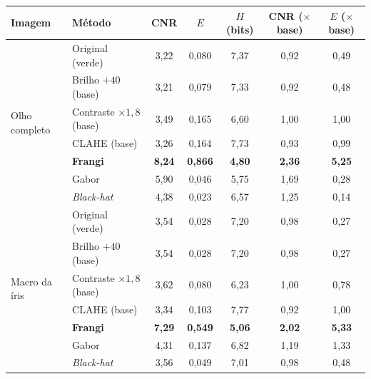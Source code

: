 \begin{tabular}{llccccc}
\toprule
Imagem & Método & CNR & $E$ & $H$ (bits) & CNR ($\times$base) & $E$ ($\times$base) \\
\midrule
\multirow{7}{*}{Olho completo} & Original (verde) & 3,22 & 0,080 & 7,37 & 0,92 & 0,49 \\
 & Brilho $+40$ (base) & 3,21 & 0,079 & 7,33 & 0,92 & 0,48 \\
 & Contraste $\times1{,}8$ (base) & 3,49 & 0,165 & 6,60 & 1,00 & 1,00 \\
 & CLAHE (base) & 3,26 & 0,164 & 7,73 & 0,93 & 0,99 \\
 & \textbf{Frangi} & \textbf{8,24} & \textbf{0,866} & \textbf{4,80} & \textbf{2,36} & \textbf{5,25} \\
 & Gabor & 5,90 & 0,046 & 5,75 & 1,69 & 0,28 \\
 & \textit{Black-hat} & 4,38 & 0,023 & 6,57 & 1,25 & 0,14 \\
\midrule
\multirow{7}{*}{Macro da íris} & Original (verde) & 3,54 & 0,028 & 7,20 & 0,98 & 0,27 \\
 & Brilho $+40$ (base) & 3,54 & 0,028 & 7,20 & 0,98 & 0,27 \\
 & Contraste $\times1{,}8$ (base) & 3,62 & 0,080 & 6,23 & 1,00 & 0,78 \\
 & CLAHE (base) & 3,34 & 0,103 & 7,77 & 0,92 & 1,00 \\
 & \textbf{Frangi} & \textbf{7,29} & \textbf{0,549} & \textbf{5,06} & \textbf{2,02} & \textbf{5,33} \\
 & Gabor & 4,31 & 0,137 & 6,82 & 1,19 & 1,33 \\
 & \textit{Black-hat} & 3,56 & 0,049 & 7,01 & 0,98 & 0,48 \\
\bottomrule
\end{tabular}
